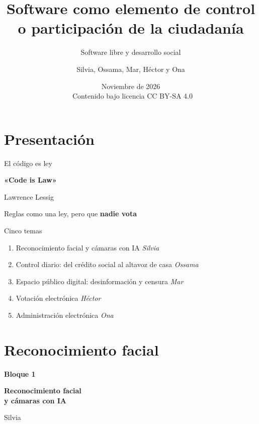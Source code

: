 \documentclass[aspectratio=169,12pt]{beamer}
\title[Software: control o participación]{Software como elemento de control o participación de la ciudadanía}
\subtitle{Software libre y desarrollo social}
\author[Grupo SLDS]{Silvia, Ossama, Mar, Héctor y Ona}
\institute{FIB}
\date{Noviembre de 2026\\[0.3cm]{\small\ccbysa\ Contenido bajo licencia CC BY-SA 4.0}}
\def\navprev{}
\def\navnext{}
\newcommand{\nav}[2]{\gdef\navprev{#1}\gdef\navnext{#2}}
\newcommand{\bloque}[3]{%
  \begin{frame}[plain]
    \vfill
    \begin{center}
      {\color{terra}\large\bfseries Bloque #1}\\[0.3cm]
      {\color{azul}\LARGE\bfseries #2\par}\vspace{0.5cm}
      {\large #3}
    \end{center}
    \vfill
  \end{frame}}
\begin{document}
\begin{frame}
  \titlepage
\end{frame}

\section{Presentación}
\nav{}{Índice}
\begin{frame}{El código es ley}
  \vspace{0.4cm}
  \begin{center}
    {\color{azul}\fontsize{40}{46}\selectfont\bfseries «Code is Law»\par}
    \vspace{0.3cm}
    {\Large\color{gris} Lawrence Lessig\par}
    \vspace{0.9cm}
    {\Large Reglas como una ley, pero que \alert{\textbf{nadie vota}}\par}
  \end{center}
\end{frame}


\nav{Code is Law}{}
\begin{frame}{Cinco temas}
  \begin{enumerate}
    \item Reconocimiento facial y cámaras con IA \hfill \textit{Silvia}
    \item Control diario: del crédito social al altavoz de casa \hfill \textit{Ossama}
    \item Espacio público digital: desinformación y censura \hfill \textit{Mar}
    \item Votación electrónica \hfill \textit{Héctor}
    \item Administración electrónica \hfill \textit{Ona}
  \end{enumerate}
\end{frame}

\section{Reconocimiento facial}
\nav{}{}
\bloque{1}{Reconocimiento facial\\y cámaras con IA}{Silvia}
\end{document}
